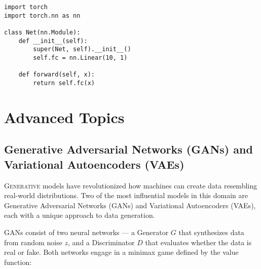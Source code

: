 \documentclass{book}
\begin{document}
\begin{lstlisting}[style=mystyle, caption={A simple neural net in PyTorch}]
import torch
import torch.nn as nn

class Net(nn.Module):
    def __init__(self):
        super(Net, self).__init__()
        self.fc = nn.Linear(10, 1)

    def forward(self, x):
        return self.fc(x)
\end{lstlisting}

\chapter{Advanced Topics}

\section{Generative Adversarial Networks (GANs) and Variational Autoencoders (VAEs)}

\lettrine{G}{enerative} models have revolutionized how machines can create data resembling real-world distributions. Two of the most influential models in this domain are Generative Adversarial Networks (GANs) and Variational Autoencoders (VAEs), each with a unique approach to data generation.

\vspace{0.5cm}
\begin{center}
\end{center}

\vspace{0.5cm}
GANs consist of two neural networks — a Generator \(G\) that synthesizes data from random noise \(z\), and a Discriminator \(D\) that evaluates whether the data is real or fake. Both networks engage in a minimax game defined by the value function:
\end{document}
